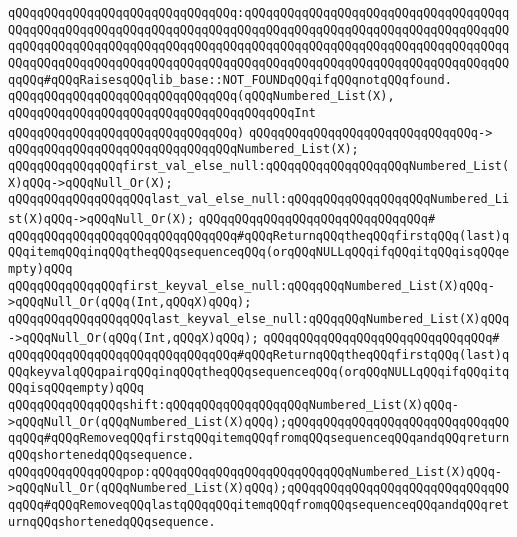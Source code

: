 \verb|qQQqqQQqqQQqqQQqqQQqqQQqqQQqqQQq:qQQqqQQqqQQqqQQqqQQqqQQqqQQqqQQqqQQqqQQqqQQqqQQqqQQqqQQqqQQqqQQqqQQqqQQqqQQqqQQqqQQqqQQqqQQqqQQqqQQqqQQqqQQqqQQqqQQqqQQqqQQqqQQqqQQqqQQqqQQqqQQqqQQqqQQqqQQqqQQqqQQqqQQqqQQqqQQqqQQqqQQqqQQqqQQqqQQqqQQqqQQqqQQqqQQqqQQqqQQqqQQqqQQqqQQqqQQqqQQqqQQqqQQqqQQq#qQQqRaisesqQQqlib_base::NOT_FOUNDqQQqifqQQqnotqQQqfound.|\newline
\verb|qQQqqQQqqQQqqQQqqQQqqQQqqQQqqQQq(qQQqNumbered_List(X),|\newline
\verb|qQQqqQQqqQQqqQQqqQQqqQQqqQQqqQQqqQQqqQQqInt|\newline
\verb|qQQqqQQqqQQqqQQqqQQqqQQqqQQqqQQq)|\newline
\verb|qQQqqQQqqQQqqQQqqQQqqQQqqQQqqQQq->|\newline
\verb|qQQqqQQqqQQqqQQqqQQqqQQqqQQqqQQqNumbered_List(X);|\newline
\newline
\verb|qQQqqQQqqQQqqQQqfirst_val_else_null:qQQqqQQqqQQqqQQqqQQqNumbered_List(X)qQQq->qQQqNull_Or(X);|\newline
\verb|qQQqqQQqqQQqqQQqqQQqlast_val_else_null:qQQqqQQqqQQqqQQqqQQqNumbered_List(X)qQQq->qQQqNull_Or(X);|\newline
\verb|qQQqqQQqqQQqqQQqqQQqqQQqqQQqqQQq#|\newline
\verb|qQQqqQQqqQQqqQQqqQQqqQQqqQQqqQQq#qQQqReturnqQQqtheqQQqfirstqQQq(last)qQQqitemqQQqinqQQqtheqQQqsequenceqQQq(orqQQqNULLqQQqifqQQqitqQQqisqQQqempty)qQQq|\newline
\newline
\verb|qQQqqQQqqQQqqQQqfirst_keyval_else_null:qQQqqQQqNumbered_List(X)qQQq->qQQqNull_Or(qQQq(Int,qQQqX)qQQq);|\newline
\verb|qQQqqQQqqQQqqQQqqQQqlast_keyval_else_null:qQQqqQQqNumbered_List(X)qQQq->qQQqNull_Or(qQQq(Int,qQQqX)qQQq);|\newline
\verb|qQQqqQQqqQQqqQQqqQQqqQQqqQQqqQQq#|\newline
\verb|qQQqqQQqqQQqqQQqqQQqqQQqqQQqqQQq#qQQqReturnqQQqtheqQQqfirstqQQq(last)qQQqkeyvalqQQqpairqQQqinqQQqtheqQQqsequenceqQQq(orqQQqNULLqQQqifqQQqitqQQqisqQQqempty)qQQq|\newline
\newline
\verb|qQQqqQQqqQQqqQQqshift:qQQqqQQqqQQqqQQqqQQqNumbered_List(X)qQQq->qQQqNull_Or(qQQqNumbered_List(X)qQQq);qQQqqQQqqQQqqQQqqQQqqQQqqQQqqQQqqQQq#qQQqRemoveqQQqfirstqQQqitemqQQqfromqQQqsequenceqQQqandqQQqreturnqQQqshortenedqQQqsequence.|\newline
\verb|qQQqqQQqqQQqqQQqpop:qQQqqQQqqQQqqQQqqQQqqQQqqQQqNumbered_List(X)qQQq->qQQqNull_Or(qQQqNumbered_List(X)qQQq);qQQqqQQqqQQqqQQqqQQqqQQqqQQqqQQqqQQq#qQQqRemoveqQQqlastqQQqqQQqitemqQQqfromqQQqsequenceqQQqandqQQqreturnqQQqshortenedqQQqsequence.|\newline
